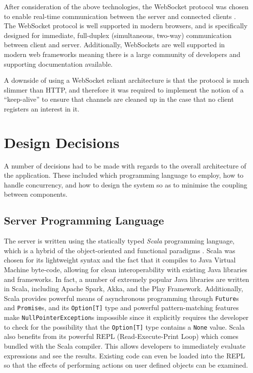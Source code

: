 \documentclass{l4proj}
\newcommand{\code}[1]{\texttt{#1}}
\begin{document}
       After consideration of the above technologies, the WebSocket protocol was chosen to enable real-time communication between the server and connected clients \cite{websocket}. The WebSocket protocol is well supported in modern browsers, and is specifically designed for immediate, full-duplex (simultaneous, two-way) communication between client and server. Additionally, WebSockets are well supported in modern web frameworks meaning there is a large community of developers  and supporting documentation available.
          
        A downside of using a WebSocket reliant architecture is that the protocol is much slimmer than HTTP, and therefore it was required to implement the notion of a ``keep-alive'' to ensure that channels are cleaned up in the case that no client registers an interest in it.


    \section{Design Decisions}

    A number of decisions had to be made with regards to the overall architecture of the application. These included which programming language to employ, how to handle concurrency, and how to design the system so as to minimise the coupling between components.

    \subsection{Server Programming Language}
            The server is written using the statically typed \textit{Scala} programming language, which is a hybrid of the object-oriented and functional paradigms \cite{scala}. Scala was chosen for its lightweight syntax and the fact that it compiles to Java Virtual Machine byte-code, allowing for clean interoperability with existing Java libraries and frameworks. In fact, a number of extremely popular Java libraries are written in Scala, including Apache Spark, Akka, and the Play Framework. Additionally, Scala provides powerful means of asynchronous programming through \code{Future}s and \code{Promise}s, and its \code{Option[T]} type and powerful pattern-matching features make \code{NullPointerException}s impossible since it explicitly requires the developer to check for the possibility that the \code{Option[T]} type contains a \code{None} value. Scala also benefits from its powerful REPL (Read-Execute-Print Loop) which comes bundled with the Scala compiler. This allows developers to immediately evaluate expressions and see the results. Existing code can even be loaded into the REPL so that the effects of performing actions on user defined objects can be examined.
            
\end{document}
